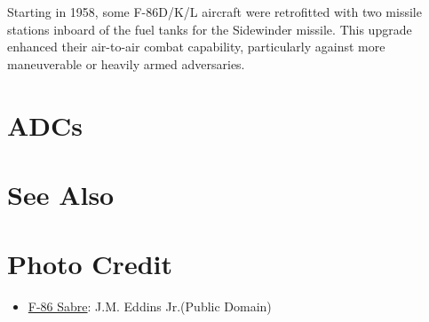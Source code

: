 Starting in 1958, some F-86D/K/L aircraft were retrofitted with two missile stations inboard of the fuel tanks for the Sidewinder missile. This upgrade enhanced their air-to-air combat capability, particularly against more maneuverable or heavily armed adversaries.

\section{ADCs}

\begin{adclist}
\end{adclist}

\section{See Also}
\begin{typelist}
\end{typelist}

\listofnotes

\section{Photo Credit}
\begin{itemize}\raggedright
    \item \href{https://commons.wikimedia.org/wiki/File:F-86_Sabre_hertiage_flight.jpg}{F-86 Sabre}: J.M. Eddins Jr.\@ (Public Domain)
\end{itemize}
